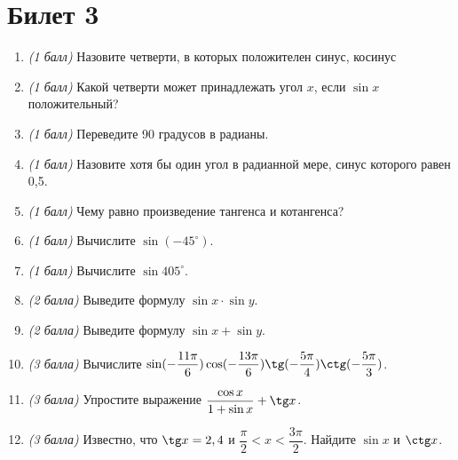 \documentclass[12pt, a4paper]{article}
\begin{document}
	\section*{Билет 3}
	\begin{enumerate}
		\item \textit{(1 балл)} Назовите четверти, в которых положителен синус, косинус
		\item \textit{(1 балл)} Какой четверти может принадлежать угол $x$, если $\sin x$ положительный?
		\item \textit{(1 балл)} Переведите 90 градусов в радианы.
		\item \textit{(1 балл)}	Назовите хотя бы один угол в радианной мере, синус которого равен 0,5.
		\item \textit{(1 балл)} Чему равно произведение тангенса и котангенса?
		\item \textit{(1 балл)} Вычислите $\sin (-45^{\circ})$.
		\item \textit{(1 балл)} Вычислите $\sin 405^{\circ}$.
		\item \textit{(2 балла)} Выведите формулу $\sin x \cdot \sin y$.
		\item \textit{(2 балла)} Выведите формулу $\sin x + \sin y$.
		\item \textit{(3 балла)} Вычислите $\sin (-\dfrac{11\pi}{6}) \cos (-\dfrac{13\pi}{6}) \tg (-\dfrac{5\pi}{4}) \ctg (-\dfrac{5\pi}{3})$.
		\item \textit{(3 балла)} Упростите выражение $\dfrac{\cos x}{1+\sin x}+ \tg x$.
		\item \textit{(3 балла)} Известно, что $\tg x=2,4$ и $\dfrac{\pi}{2}<x<\dfrac{3\pi}{2}$. Найдите $\sin x$ и $\ctg x$.
	\end{enumerate}
\end{document}
